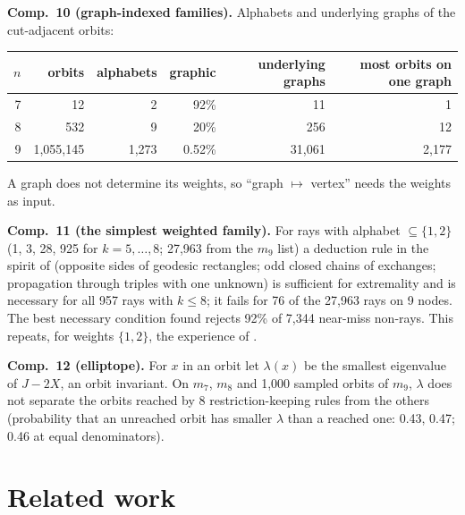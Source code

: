 \documentclass[11pt,a4paper]{article}
\theoremstyle{definition}
\theoremstyle{remark}
\newcommand{\comp}[1]{\medskip\noindent\textbf{#1}}
\begin{document}
\comp{Comp.~10 (graph-indexed families).} Alphabets and underlying graphs of the cut-adjacent orbits:
\begin{center}
\begin{tabular}{rrrrrr}
\toprule
$n$ & orbits & alphabets & graphic & underlying graphs & most orbits on one graph \\
\midrule
7 & 12 & 2 & 92\% & 11 & 1 \\
8 & 532 & 9 & 20\% & 256 & 12 \\
9 & 1,055,145 & 1,273 & 0.52\% & 31,061 & 2,177 \\
\bottomrule
\end{tabular}
\end{center}
A graph does not determine its weights, so ``graph $\mapsto$ vertex'' needs the weights as input.

\comp{Comp.~11 (the simplest weighted family).} For rays with alphabet $\subseteq \{1, 2\}$ (1, 3, 28, 925 for
$k = 5, \dots, 8$; 27,963 from the $m_9$ list) a deduction rule in the spirit of \cite[\S2]{A80} (opposite sides of
geodesic rectangles; odd closed chains of exchanges; propagation through triples with one unknown) is sufficient for
extremality and is necessary for all 957 rays with $k \le 8$; it fails for 76 of the 27,963 rays on 9 nodes. The
best necessary condition found rejects 92\% of 7,344 near-miss non-rays. This repeats, for weights $\{1, 2\}$, the
experience of \cite[pp.~132--133]{A80}.

\comp{Comp.~12 (elliptope).} For $x$ in an orbit let $\lambda(x)$ be the smallest eigenvalue of $J - 2X$, an orbit
invariant. On $m_7$, $m_8$ and 1,000 sampled orbits of $m_9$, $\lambda$ does not separate the orbits reached by 8
restriction-keeping rules from the others (probability that an unreached orbit has smaller $\lambda$ than a reached
one: 0.43, 0.47; 0.46 at equal denominators).

\section{Related work}
\end{document}
